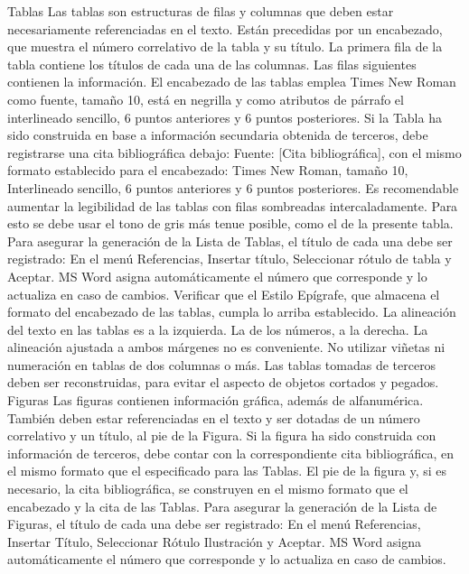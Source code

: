 Tablas
Las tablas son estructuras de filas y columnas que deben estar necesariamente
referenciadas en el texto. Están precedidas por un encabezado, que muestra el
número correlativo de la tabla y su título. La primera fila de la tabla contiene los
títulos de cada una de las columnas. Las filas siguientes contienen la información.
El encabezado de las tablas emplea Times New Roman como fuente, tamaño 10,
está en negrilla y como atributos de párrafo el interlineado sencillo, 6 puntos
anteriores y 6 puntos posteriores.
Si la Tabla ha sido construida en base a información secundaria obtenida de
terceros, debe registrarse una cita bibliográfica debajo: Fuente: [Cita bibliográfica],
con el mismo formato establecido para el encabezado: Times New Roman, tamaño
10, Interlineado sencillo, 6 puntos anteriores y 6 puntos posteriores.
Es recomendable aumentar la legibilidad de las tablas con filas sombreadas
intercaladamente. Para esto se debe usar el tono de gris más tenue posible, como el
de la presente tabla.
Para asegurar la generación de la Lista de Tablas, el título de cada una debe ser
registrado: En el menú Referencias, Insertar título, Seleccionar rótulo de tabla y
Aceptar. MS Word asigna automáticamente el número que corresponde y lo
actualiza en caso de cambios. Verificar que el Estilo Epígrafe, que almacena el
formato del encabezado de las tablas, cumpla lo arriba establecido.
La alineación del texto en las tablas es a la izquierda. La de los números, a la
derecha. La alineación ajustada a ambos márgenes no es conveniente.
No utilizar viñetas ni numeración en tablas de dos columnas o más.
Las tablas tomadas de terceros deben ser reconstruidas, para evitar el aspecto de
objetos cortados y pegados.
Figuras
Las figuras contienen información gráfica, además de alfanumérica.
También deben estar referenciadas en el texto y ser dotadas de un número
correlativo y un título, al pie de la Figura.
Si la figura ha sido construida con información de terceros, debe contar con la
correspondiente cita bibliográfica, en el mismo formato que el especificado para las
Tablas.
El pie de la figura y, si es necesario, la cita bibliográfica, se construyen en el mismo
formato que el encabezado y la cita de las Tablas.
Para asegurar la generación de la Lista de Figuras, el título de cada una debe ser
registrado: En el menú Referencias, Insertar Título, Seleccionar Rótulo Ilustración
y Aceptar. MS Word asigna automáticamente el número que corresponde y lo
actualiza en caso de cambios.



